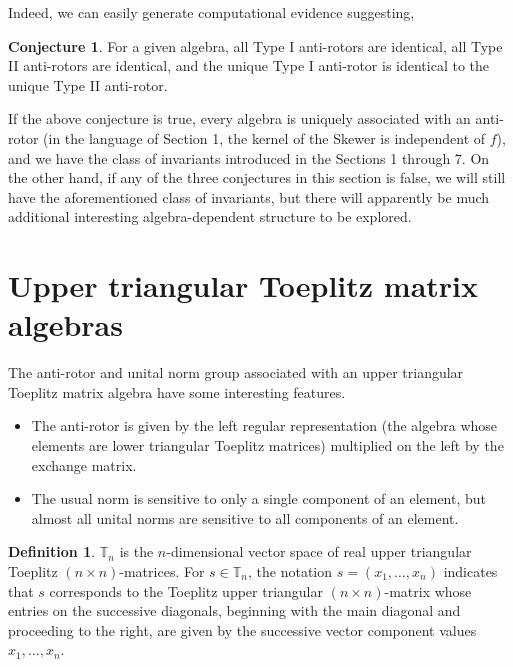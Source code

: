 \documentclass{amsart}
\theoremstyle{definition}
\newtheorem{definition}[theorem]{Definition}
\newtheorem{conjecture}[theorem]{Conjecture}
\numberwithin{theorem}{section}
\numberwithin{equation}{section}
\begin{document}
Indeed, we can easily generate computational evidence suggesting, 

\begin{conjecture}\label{10/28/25.1} For a given algebra, all Type I anti-rotors are identical, all Type II anti-rotors are identical, and the unique Type I anti-rotor is identical to the unique Type II anti-rotor. \end{conjecture}

If the above conjecture is true, every algebra is uniquely associated with an anti-rotor (in the language of Section 1, the kernel of the Skewer is independent of $f$), and we have the class of invariants introduced in the Sections 1 through 7.  On the other hand, if any of the three conjectures in this section is false, we will still have the aforementioned class of invariants, but there will apparently be much additional interesting algebra-dependent structure to be explored.
  
  

\vspace{.75cm}
 
 
 
\appendix

\section{Upper triangular Toeplitz matrix algebras} 

The anti-rotor and unital norm group associated with an upper triangular Toeplitz matrix algebra have some interesting features.
\begin{itemize}\item The anti-rotor is given by the left regular representation (the algebra whose elements are lower triangular Toeplitz matrices) multiplied on the left by the exchange matrix. \item The usual norm is sensitive to only a single component of an element, but almost all unital norms are sensitive to all components of an element.\end{itemize}


 \begin{definition}\label{5/4/22.1} $\mathbb{T}_n$ is the $n$-dimensional vector space of real upper triangular Toeplitz $(n\times n)$-matrices. For $s\in \mathbb{T}_n$, the notation $s=(x_1,\dots,x_n)$ indicates that $s$ corresponds to the Toeplitz upper triangular $(n\times n)$-matrix whose entries on the successive diagonals, beginning with the main diagonal and proceeding to the right, are given by the successive vector component values $x_1,\dots,x_n$.   
\end{definition}
\end{document}
